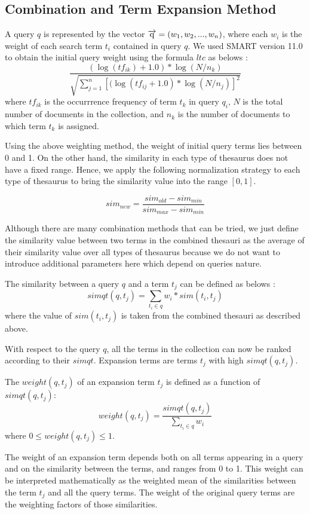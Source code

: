 \subsection{Combination and Term Expansion Method}

A query $q$ is represented by the vector $\overrightarrow{\rm
q}=(w_1,w_2,...,w_n)$, where each $w_i$ is the weight of each search
term $t_i$ contained in  query $q$. We used SMART version 11.0
\cite{salton71} to
obtain the initial query weight using the formula $ltc$ as belows :
\[\frac{(\log(tf_{ik}) + 1.0) * \log(N/n_k)}{\sqrt{\displaystyle
\sum_{j=1}^n[(\log(tf_{ij} + 1.0)*\log(N/n_j)]^2}}\]
where $tf_{ik}$ is the occurrrence frequency of term $t_k$ in query
$q_i$, $N$ is the total number of documents in the collection, and $n_k$ 
is the number of documents to which term $t_k$ is assigned.

Using the above weighting method, the weight  of  initial query terms lies between 0 and 1. On the other hand, the similarity in each type of thesaurus does not have a fixed range. Hence,  we apply the following normalization strategy to each type of thesaurus to bring the  similarity value into the range $[0,1]$.

\[sim_{new} = \frac{sim_{old} - sim_{min}}{sim_{max}-sim_{min}}\] 

Although there are many combination methods that can be tried, we just define the similarity value between two terms in the combined thesauri  as the average of their similarity value over all types of thesaurus because we do not want to introduce additional parameters here which depend on queries nature.

The similarity between a query $q$ and a term $t_j$ can be defined as belows \cite{qiu93}:
\[simqt(q,t_j) = \sum_{t_i \in q} w_i*sim(t_i,t_j)\]
where the  value of $sim(t_i,t_j)$ is taken from the combined thesauri as described above.

With respect to the query $q$,  all the terms in the collection can now be ranked according to their $simqt$. Expansion terms are  terms $t_j$ with high $simqt(q,t_j)$.


The $weight(q,t_j)$ of an expansion term $t_j$ is defined as a function of $simqt(q,t_j)$:
\[weight(q,t_j) = \frac{simqt(q,t_j)}{\sum_{t_i \in q} w_i}\]
where $0 \leq weight(q,t_j) \leq 1$. 

The weight of an expansion term depends both on all terms appearing in a query and on the similarity between the terms, and ranges from 0 to 1. This weight  can be interpreted mathematically as the weighted mean of the similarities between the term $t_j$ and all the query terms. The weight of the original query terms are the weighting factors of those similarities. 

